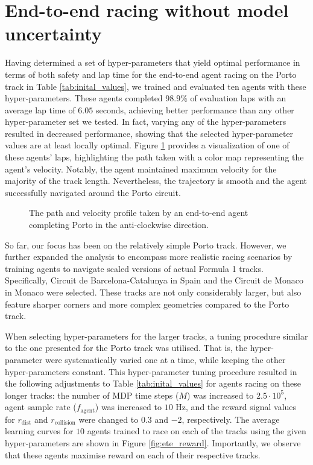 
\section{End-to-end racing without model uncertainty}

Having determined a set of hyper-parameters that yield optimal performance in terms of both safety and lap time for the end-to-end agent racing on the Porto track in Table \ref{tab:inital_values}, we trained and evaluated ten agents with these hyper-parameters.
These agents completed $98.9\%$ of evaluation laps with an average lap time of $6.05$ seconds, achieving better performance than any other hyper-parameter set we tested.
In fact, varying any of the hyper-parameters resulted in decreased performance, showing that the selected hyper-parameter values are at least locally optimal.
Figure \ref{fig:ete_porto} provides a visualization of one of these agents' laps, highlighting the path taken with a color map representing the agent's velocity. 
Notably, the agent maintained maximum velocity for the majority of the track length.
Nevertheless, the trajectory is smooth and the agent successfully navigated around the Porto circuit.

\begin{figure}[htb!]
    \centering
    
    \caption[The path and velocity profile taken by an end-to-end agent completing Porto]{The path and velocity profile taken by an end-to-end agent completing Porto in the anti-clockwise direction.}
    \label{fig:ete_porto}
\end{figure}


So far, our focus has been on the relatively simple Porto track. 
However, we further expanded the analysis to encompass more realistic racing scenarios by training agents to navigate scaled versions of actual Formula 1 tracks. 
Specifically, Circuit de Barcelona-Catalunya in Spain and the Circuit de Monaco in Monaco were selected. 
These tracks are not only considerably larger, but also feature sharper corners and more complex geometries compared to the Porto track.


When selecting hyper-parameters for the larger tracks, a tuning procedure similar to the one presented for the Porto track was utilised. 
That is, the hyper-parameter were systematically varied one at a time, while keeping the other hyper-parameters constant. 
This hyper-parameter tuning procedure resulted in the following adjustments to Table \ref{tab:inital_values} for agents racing on these longer tracks: the number of MDP time steps ($M$) was increased to $2.5\cdot10^{5}$, agent sample rate ($f_{\text{agent}}$) was increased to $10$ Hz, and the reward signal values for $r_{\text{dist}}$ and  $r_{\text{collision}}$ were changed to $0.3$ and $-2$, respectively.
The average learning curves for $10$ agents trained to race on each of the tracks using the given hyper-parameters are shown in Figure \ref{fig:ete_reward}.
Importantly, we observe that these agents maximise reward on each of their respective tracks.

